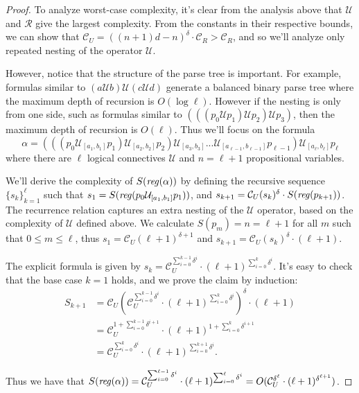 \documentclass[runningheads]{llncs}
\begin{document}
\begin{proof}
    To analyze worst-case complexity, it's clear from the analysis above that $\mathcal{U}$ and $\mathcal{R}$ give the largest complexity. From the constants in their respective bounds, we can show that $\mathcal{C}_U = ((n+1)d - n)^\delta \cdot \mathcal{C}_R > \mathcal{C}_R$, and so we'll analyze only repeated nesting of the operator $\mathcal{U}$.
    
    However, notice that the structure of the parse tree is important. For example, formulas similar to $(a \mathcal{U} b) \mathcal{U} (c \mathcal{U} d)$ generate a balanced binary parse tree where the maximum depth of recursion is $O(\log \ell)$. However if the nesting is only from one side, such as formulas similar to $(((p_0 \mathcal{U} p_1) \mathcal{U} p_2) \mathcal{U} p_3)$, then the maximum depth of recursion is $O(\ell)$. Thus we'll focus on the formula $$\alpha = (((p_0 \mathcal{U}_{[a_1, b_1]} p_1) \mathcal{U}_{[a_2, b_2]} p_2) \mathcal{U}_{[a_3, b_3]}... \mathcal{U}_{[a_{\ell - 1}, b_{\ell - 1}]} p_{\ell - 1}) \mathcal{U}_{[a_\ell, b_\ell]} p_\ell$$ where there are $\ell$ logical connectives $\mathcal{U}$ and $n = \ell + 1$ propositional variables. 
    
    We'll derive the complexity of $S(\text{\emph{reg}}(\alpha))$ by defining the recursive sequence $\{s_k\}_{k = 1}^\ell$ such that $s_1 = S(\text{\emph{reg}}(p_0 \mathcal{U}_{[a_1, b_1]} p_1))$, and $s_{k+1} = \mathcal{C}_U (s_k)^\delta \cdot S(\text{\emph{reg}}(p_{k+1}))$. The recurrence relation captures an extra nesting of the $\mathcal{U}$ operator, based on the complexity of $\mathcal{U}$ defined above. We calculate $S(p_m) = n = \ell + 1$ for all $m$ such that $0 \leq m \leq \ell$, thus $s_1 = \mathcal{C}_U(\ell + 1)^{\delta + 1}$ and $s_{k+1} = \mathcal{C}_U (s_k)^\delta \cdot (\ell + 1)$. 
    
    The explicit formula is given by $s_k = \mathcal{C}_U^{\sum_{i = 0}^{k - 1} \delta^i} \cdot (\ell + 1)^{\sum_{i = 0}^{k} \delta^i}$. It's easy to check that the base case $k = 1$ holds, and we prove the claim by induction:
    \begin{align*}
        S_{k + 1} &= \mathcal{C}_U (\mathcal{C}_U^{\sum_{i = 0}^{k - 1} \delta^i} \cdot (\ell + 1)^{\sum_{i = 0}^{k} \delta^i}) ^ \delta \cdot (\ell + 1) \\
        &= \mathcal{C}_U^{1 + \sum_{i = 0}^{k - 1} \delta^{i + 1}} \cdot (\ell + 1)^{1 + \sum_{i = 0}^{k} \delta^{i + 1}} \\
        &= \mathcal{C}_U^{\sum_{i = 0}^k \delta^i} \cdot (\ell + 1)^{\sum_{i = 0}^{k+1} \delta^i}.
    \end{align*}
    
    \noindent Thus we have that $S(\text{\emph{reg}}(\alpha)) = \mathcal{C}_U^{\sum_{i = 0}^{\ell - 1} \delta^i} \cdot (\ell + 1)^{\sum_{i = 0}^{\ell} \delta^i} = O(\mathcal{C}_U^{\delta ^ \ell} \cdot (\ell + 1)^{\delta^{\ell + 1}})$.
    
 \end{proof}
\end{document}
